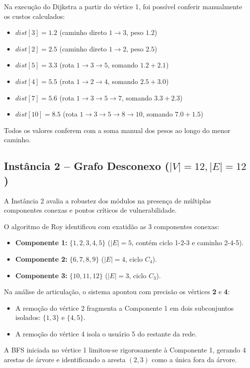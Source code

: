 \documentclass[12pt,a4paper]{article}
\begin{document}
Na execução do Dijkstra a partir do vértice 1, foi possível conferir manualmente os custos calculados:
\begin{itemize}
    \item $dist[3] = 1.2$ (caminho direto $1 \to 3$, peso $1.2$)
    \item $dist[2] = 2.5$ (caminho direto $1 \to 2$, peso $2.5$)
    \item $dist[5] = 3.3$ (rota $1 \to 3 \to 5$, somando $1.2 + 2.1$)
    \item $dist[4] = 5.5$ (rota $1 \to 2 \to 4$, somando $2.5 + 3.0$)
    \item $dist[7] = 5.6$ (rota $1 \to 3 \to 5 \to 7$, somando $3.3 + 2.3$)
    \item $dist[10] = 8.5$ (rota $1 \to 3 \to 5 \to 8 \to 10$, somando $7.0 + 1.5$)
\end{itemize}
Todos os valores conferem com a soma manual dos pesos ao longo do menor caminho.

\subsection{Instância 2 -- Grafo Desconexo ($|V|=12, |E|=12$)}
A Instância 2 avalia a robustez dos módulos na presença de múltiplas componentes conexas e pontos críticos de vulnerabilidade.



O algoritmo de Roy identificou com exatidão as 3 componentes conexas:
\begin{itemize}
    \item \textbf{Componente 1:} $\{1, 2, 3, 4, 5\}$ ($|E|=5$, contém ciclo 1-2-3 e caminho 2-4-5).
    \item \textbf{Componente 2:} $\{6, 7, 8, 9\}$ ($|E|=4$, ciclo $C_4$).
    \item \textbf{Componente 3:} $\{10, 11, 12\}$ ($|E|=3$, ciclo $C_3$).
\end{itemize}

Na análise de articulação, o sistema apontou com precisão os vértices \textbf{2} e \textbf{4}:
\begin{itemize}
    \item A remoção do vértice 2 fragmenta a Componente 1 em dois subconjuntos isolados: $\{1, 3\}$ e $\{4, 5\}$.
    \item A remoção do vértice 4 isola o usuário 5 do restante da rede.
\end{itemize}

A BFS iniciada no vértice 1 limitou-se rigorosamente à Componente 1, gerando 4 arestas de árvore e identificando a aresta $(2, 3)$ como a única fora da árvore.
\end{document}
